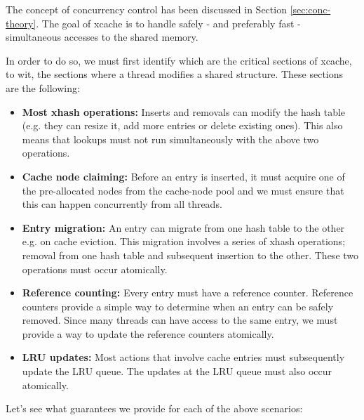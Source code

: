 The concept of concurrency control has been discussed in Section 
\ref{sec:conc-theory}.  The goal of xcache is to handle safely - and preferably 
fast - simultaneous accesses to the shared memory.

In order to do so, we must first identify which are the critical sections of 
xcache, to wit, the sections where a thread modifies a shared structure. These 
sections are the following:

\begin{itemize}
	\item
		\textbf{Most xhash operations:} Inserts and removals can modify 
		the hash table (e.g. they can resize it, add more entries or 
		delete existing ones). This also means that lookups must not 
		run simultaneously with the above two operations.
	\item
		\textbf{Cache node claiming:} Before an entry is inserted, it 
		must	acquire one of the pre-allocated nodes from the 
		cache-node pool and we must ensure that this can happen 
		concurrently from all threads.
	\item
		\textbf{Entry migration:} An entry can migrate from one hash 
		table to the other e.g. on cache eviction. This migration 
		involves a series of xhash operations; removal from one hash 
		table and subsequent insertion to the other. These two 
		operations must occur atomically.
	\item
		\textbf{Reference counting:} Every entry must have a reference 
		counter.  Reference counters provide a simple way to determine 
		when an entry can be safely removed. Since many threads can 
		have access to the same entry, we must provide a way to update 
		the reference counters atomically.
	\item
		\textbf{LRU updates:} Most actions that involve cache entries 
		must subsequently update the LRU queue. The updates at the LRU 
		queue must also occur atomically.
\end{itemize}

Let's see what guarantees we provide for each of the above scenarios:

